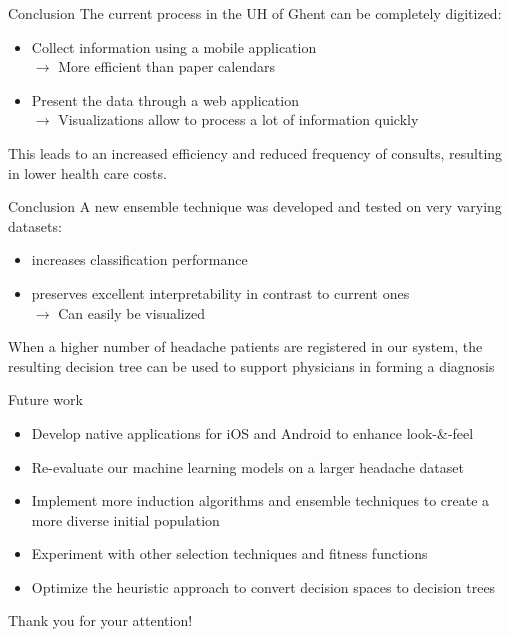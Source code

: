 \documentclass[english]{beamer}
\begin{document}



\begin{frame}{Conclusion}
	The current process in the UH of Ghent can be completely digitized:
	\begin{itemize}
		\item Collect information using a mobile application \\
		$\rightarrow$ More efficient than paper calendars
		\item Present the data through a web application \\
		$\rightarrow$ Visualizations allow to process a lot of information quickly
	\end{itemize}
	This leads to an increased efficiency and reduced frequency of consults, resulting in lower health care costs.
\end{frame}

\begin{frame}{Conclusion}
	A new ensemble technique was developed and tested on very varying datasets:
	\begin{itemize}
		\item increases classification performance
		\item preserves excellent interpretability in contrast to current ones \\
		$\rightarrow$ Can easily be visualized
	\end{itemize}
	When a higher number of headache patients are registered in our system, the resulting decision tree can be used to support physicians in forming a diagnosis
\end{frame}

\begin{frame}{Future work}
	\begin{itemize}
		\item Develop native applications for iOS and Android to enhance look-\&-feel
		\item Re-evaluate our machine learning models on a larger headache dataset
		\item Implement more induction algorithms and ensemble techniques to create a more diverse initial population
		\item Experiment with other selection techniques
		and fitness functions
		\item Optimize the heuristic approach to convert decision spaces to decision trees
	\end{itemize}
\end{frame}

{
\begin{frame}{Thank you for your attention!}
	\scriptsize{\tableofcontents[hidesubsections]}
\end{frame} }
\end{document}
